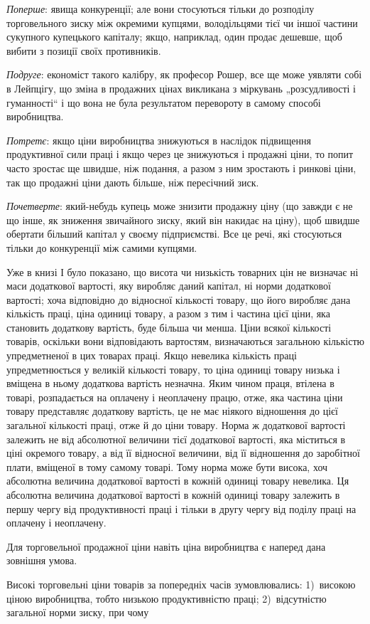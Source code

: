 
\emph{Поперше}: явища конкуренції; але вони стосуються тільки до
розподілу торговельного зиску між окремими купцями, володільцями
тієї чи іншої частини сукупного купецького капіталу; якщо,
наприклад, один продає дешевше, щоб вибити з позиції своїх
противників.

\emph{Подруге}: економіст такого калібру, як професор Рошер, все
ще може уявляти собі в Лейпцігу, що зміна в продажних цінах
викликана з міркувань „розсудливості і гуманності“ і що вона
не була результатом перевороту в самому способі виробництва.

\emph{Потретє}: якщо ціни виробництва знижуються в наслідок
підвищення продуктивної сили праці і якщо через це знижуються
і продажні ціни, то попит часто зростає ще швидше, ніж
подання, а разом з ним зростають і ринкові ціни, так що продажні
ціни дають більше, ніж пересічний зиск.

\emph{Почетверте}: який-небудь купець може знизити продажну
ціну (що завжди є не що інше, як зниження звичайного зиску,
який він накидає на ціну), щоб швидше обертати більший
капітал у своєму підприємстві. Все це речі, які стосуються
тільки до конкуренції між самими купцями.

Уже в книзі І було показано, що висота чи низькість товарних
цін не визначає ні маси додаткової вартості, яку
виробляє даний капітал, ні норми додаткової вартості; хоча
відповідно до відносної кількості товару, що його виробляє
дана кількість праці, ціна одиниці товару, а разом з тим
і частина цієї ціни, яка становить додаткову вартість, буде більша
чи менша. Ціни всякої кількості товарів, оскільки вони відповідають
вартостям, визначаються загальною кількістю упредметненої
в цих товарах праці. Якщо невелика кількість праці
упредметнюється у великій кількості товару, то ціна одиниці
товару низька і вміщена в ньому додаткова вартість незначна.
Яким чином праця, втілена в товарі, розпадається на оплачену
і неоплачену працю, отже, яка частина ціни товару представляє
додаткову вартість, це не має ніякого відношення до цієї загальної
кількості праці, отже й до ціни товару. Норма ж додаткової
вартості залежить не від абсолютної величини тієї
додаткової вартості, яка міститься в ціні окремого товару,
а від її відносної величини, від її відношення до заробітної плати,
вміщеної в тому самому товарі. Тому норма може бути висока,
хоч абсолютна величина додаткової вартості в кожній одиниці
товару невелика. Ця абсолютна величина додаткової вартості
в кожній одиниці товару залежить в першу чергу від продуктивності
праці і тільки в другу чергу від поділу праці на оплачену
і неоплачену.

Для торговельної продажної ціни навіть ціна виробництва є
наперед дана зовнішня умова.

Високі торговельні ціни товарів за попередніх часів зумовлювались:
1)~високою ціною виробництва, тобто низькою продуктивністю
праці; 2)~відсутністю загальної норми зиску, при чому
\parbreak{}  %
